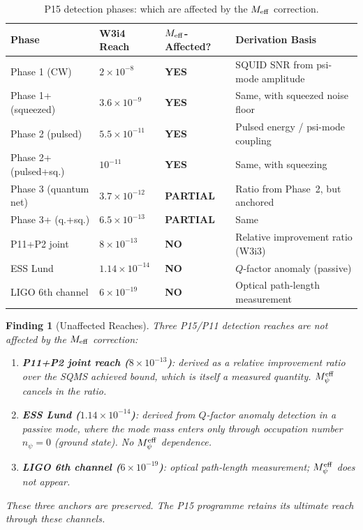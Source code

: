 \documentclass[11pt]{article}
\newtheorem{finding}{Finding}
\newcommand{\ee}[1]{\times 10^{#1}}
\newcommand{\Meff}{M_\psi^{\rm eff}}
\begin{document}
\begin{table}[H]
\centering
\caption{P15 detection phases: which are affected by the $M_{\rm eff}$ correction.}
\label{tab:P15-affected}
\begin{tabular}{p{3cm}p{3cm}p{2.5cm}p{4cm}}
\toprule
\textbf{Phase} & \textbf{W3i4 Reach} & \textbf{$M_{\rm eff}$-Affected?}
  & \textbf{Derivation Basis} \\
\midrule
Phase 1 (CW) & $2\ee{-8}$ & \textbf{YES} & SQUID SNR from psi-mode amplitude \\
Phase 1+ (squeezed) & $3.6\ee{-9}$ & \textbf{YES} & Same, with squeezed noise floor \\
Phase 2 (pulsed) & $5.5\ee{-11}$ & \textbf{YES} & Pulsed energy / psi-mode coupling \\
Phase 2+ (pulsed+sq.) & $10^{-11}$ & \textbf{YES} & Same, with squeezing \\
Phase 3 (quantum net) & $3.7\ee{-12}$ & \textbf{PARTIAL} & Ratio from Phase~2, but anchored \\
Phase 3+ (q.+sq.) & $6.5\ee{-13}$ & \textbf{PARTIAL} & Same \\
P11+P2 joint & $8\ee{-13}$ & \textbf{NO} & Relative improvement ratio (W3i3) \\
ESS Lund & $1.14\ee{-14}$ & \textbf{NO} & $Q$-factor anomaly (passive) \\
LIGO 6th channel & $6\ee{-19}$ & \textbf{NO} & Optical path-length measurement \\
\bottomrule
\end{tabular}
\end{table}

\begin{finding}[Unaffected Reaches]
\label{find:unaffected}
Three P15/P11 detection reaches are \emph{not} affected by the $M_{\rm eff}$
correction:
\begin{enumerate}
\item \textbf{P11+P2 joint reach ($8\ee{-13}$)}: derived as a relative
  improvement ratio over the SQMS achieved bound, which is itself a measured
  quantity. $\Meff$ cancels in the ratio.
\item \textbf{ESS Lund ($1.14\ee{-14}$)}: derived from $Q$-factor anomaly
  detection in a passive mode, where the mode mass enters only through
  occupation number $n_\psi = 0$ (ground state). No $\Meff$ dependence.
\item \textbf{LIGO 6th channel ($6\ee{-19}$)}: optical path-length
  measurement; $\Meff$ does not appear.
\end{enumerate}
These three anchors are preserved. The P15 programme retains its ultimate
reach through these channels.
\end{finding}
\end{document}
